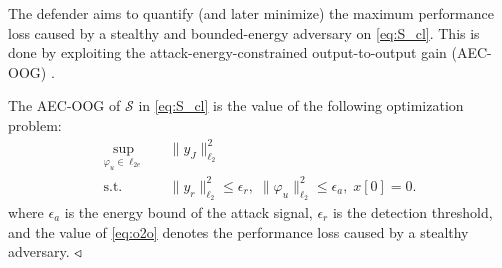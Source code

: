 The defender aims to quantify (and later minimize) the maximum performance loss caused by a stealthy and bounded-energy adversary on \eqref{eq:S_cl}. 
This is done by exploiting the attack-energy-constrained output-to-output gain 
(AEC-OOG) \citep{anand2023risk}. %
\begin{definition}\label{def:o2o}
	The AEC-OOG
    of $\mathcal S$ in \eqref{eq:S_cl} is the value of the following optimization problem:
		\begin{equation}\label{eq:o2o}
			\begin{aligned}
				\sup_{\varphi_u\in\ell_{2e}} &\quad \|y_J\|_{\ell_2}^2 \\
				\text{s.t.}& \quad  \|y_r\|_{\ell_2}^2 \leq \epsilon_r,\; \|\varphi_u\|_{\ell_2}^2 \leq \epsilon_a,\;x[0] = 0.
			\end{aligned}
		\end{equation}
	where $\epsilon_a$ is the energy bound of the attack signal, $\epsilon_r$ is the detection threshold, and the value of \eqref{eq:o2o} denotes the performance loss caused by a stealthy adversary.	$\hfill\triangleleft$
	\end{definition}

